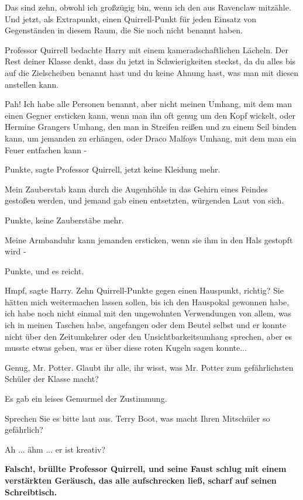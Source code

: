 \glqq Das sind zehn, obwohl ich großzügig bin, wenn ich den aus Ravenclaw
mitzähle. Und jetzt, als Extrapunkt, einen Quirrell-Punkt für jeden Einsatz von
Gegenständen in diesem Raum, die Sie noch nicht benannt haben.\grqq{}

Professor Quirrell bedachte Harry mit einem kameradschaftlichen Lächeln. \glqq
Der Rest deiner Klasse denkt, dass du jetzt in Schwierigkeiten steckst, da du
alles bis auf die Zielscheiben benannt hast und du keine Ahnung hast, was man
mit diesen anstellen kann.\grqq{}

\glqq Pah! Ich habe alle Personen benannt, aber nicht meinen Umhang, mit dem man
einen Gegner ersticken kann, wenn man ihn oft genug um den Kopf wickelt, oder
Hermine Grangers Umhang, den man in Streifen reißen und zu einem Seil binden
kann, um jemanden zu erhängen, oder Draco Malfoys Umhang, mit dem man ein Feuer
entfachen kann -\grqq{}

 Punkte\grqq{}, sagte Professor Quirrell, \glqq jetzt keine Kleidung
mehr.\grqq{}

\glqq Mein Zauberstab kann durch die Augenhöhle in das Gehirn eines Feindes
gestoßen werden\grqq{}, und jemand gab einen entsetzten, würgenden Laut von
sich.

 Punkte, keine Zauberstäbe mehr.\grqq{}

\glqq Meine Armbanduhr kann jemanden ersticken, wenn sie ihm in den Hals
gestopft wird -\grqq{}

 Punkte, und es reicht.\grqq{}

\glqq Hmpf\grqq{}, sagte Harry. \glqq Zehn Quirrell-Punkte gegen einen
Hauspunkt, richtig? Sie hätten mich weitermachen lassen sollen, bis ich den
Hauspokal gewonnen habe, ich habe noch nicht einmal mit den ungewohnten
Verwendungen von allem, was ich in meinen Taschen habe, angefangen\grqq{} oder
dem Beutel selbst und er konnte nicht über den Zeitumkehrer oder den
Unsichtbarkeitsumhang sprechen, aber es musste etwas geben, was er über diese
roten Kugeln sagen konnte...

\glqq Genug, Mr. Potter. Glaubt ihr alle, ihr wisst, was Mr. Potter zum
gefährlichsten Schüler der Klasse macht?\grqq{}

Es gab ein leises Gemurmel der Zustimmung.

\glqq Sprechen Sie es bitte laut aus. Terry Boot, was macht Ihren Mitschüler so
gefährlich?\grqq{}

\glqq Ah ... ähm ... er ist kreativ?\grqq{}

\textbf{\grqq{}Falsch!\grqq{}, brüllte Professor Quirrell, und seine Faust
schlug mit einem verstärkten Geräusch, das alle aufschrecken ließ, scharf auf
seinen Schreibtisch.}

